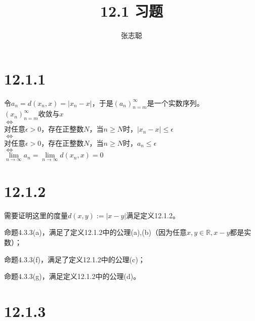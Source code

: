 \documentclass{article}
\begin{document}
\title{12.1 习题}
\author{张志聪}
\maketitle

\section*{12.1.1}

令$a_n = d(x_n, x) = |x_n - x|$，于是$(a_n)_{n=m}^\infty$是一个实数序列。\\
$(x_n)_{n = m}^\infty$收敛与$x$ \\
$\Leftrightarrow$ \\
对任意$\epsilon > 0$，存在正整数$N$，当$n \geq N$时，$|x_n - x| \leq \epsilon$ \\
$\Leftrightarrow$ \\
对任意$\epsilon > 0$，存在正整数$N$，当$n \geq N$时，$a_n \leq \epsilon$ \\
$\Leftrightarrow$ \\
$\lim\limits_{n \to \infty} a_n = \lim\limits_{n \to \infty} d(x_n, x) = 0$

\section*{12.1.2}

需要证明这里的度量$d(x, y) := |x - y|$满足定义12.1.2。

命题4.3.3(a)，满足了定义12.1.2中的公理(a),(b)（因为任意$x, y \in \mathbb{R}, x - y$都是实数）；

命题4.3.3(f)，满足了定义12.1.2中的公理(c)；

命题4.3.3(g)，满足定义12.1.2中的公理(d)。

\section*{12.1.3}
\end{document}
